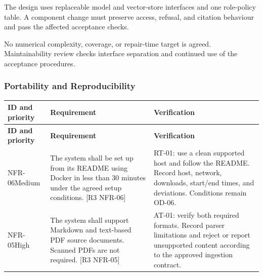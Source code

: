 \documentclass[11pt,letterpaper]{article}
\begin{document}
The design uses replaceable model and vector-store interfaces and one role-policy table. A component change must preserve access, refusal, and citation behaviour and pass the affected acceptance checks.\par

No numerical complexity, coverage, or repair-time target is agreed. Maintainability review checks interface separation and continued use of the acceptance procedures.\par

\subsubsection{Portability and Reproducibility}

\begingroup\small

\begin{longtable}{|P{\arrayrulewidth\relax}|P{\arrayrulewidth\relax}|P{\arrayrulewidth\relax}|}

\hline{}

\textbf{ID and priority} & \textbf{Requirement} & \textbf{Verification} \\ \hline

\endfirsthead

\hline{}

\textbf{ID and priority} & \textbf{Requirement} & \textbf{Verification} \\ \hline

\endhead

\hline\endfoot

\hline\endlastfoot

NFR-06\newline Medium & The system shall be set up from its README using Docker in less than 30 minutes under the agreed setup conditions. [R3 NFR-06] & RT-01: use a clean supported host and follow the README. Record host, network, downloads, start/end times, and deviations. Conditions remain OD-06. \\ \hline

NFR-05\newline High & The system shall support Markdown and text-based PDF source documents. Scanned PDFs are not required. [R3 NFR-05] & AT-01: verify both required formats. Record parser limitations and reject or report unsupported content according to the approved ingestion contract. \\ \hline

\end{longtable}
\end{document}
